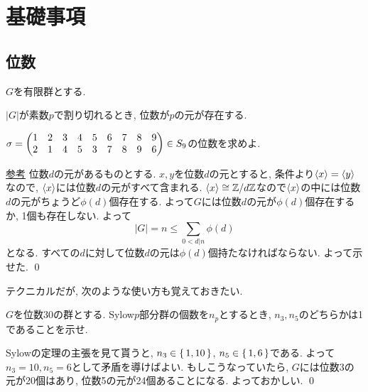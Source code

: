 \section{基礎事項}
\subsection{位数}

\begin{prop} $G$を有限群とする.
\ben
\item $|G|$が素数$p$で割り切れるとき, 位数が$p$の元が存在する.
\een
\end{prop}

\begin{prac}
$\sigma = \begin{pmatrix} 1&2&3&4&5&6&7&8&9\\ 2&1&4&5&3&7&8&9&6 \end{pmatrix}\in S_9$の位数を求めよ.
\end{prac}

    \begin{egans} \href{https://math.stackexchange.com/questions/1302635/a-finite-group-which-has-a-unique-subgroup-of-order-d-for-each-d-mid-n}{参考}
位数$d$の元があるものとする. $x,y$を位数$d$の元とすると, 条件より$\langle x\rangle = \langle y\rangle$なので, $\langle x\rangle$には位数$d$の元がすべて含まれる. $\langle x \rangle \cong \mathbb{Z}/d\mathbb{Z}$なので$\langle x\rangle$の中には位数$d$の元がちょうど$\phi(d)$個存在する. よって$G$には位数$d$の元が$\phi(d)$個存在するか, 1個も存在しない. よって
\[|G|=n \leq \sum_{0<d|n} \phi(d) \]
となる. すべての$d$に対して位数$d$の元は$\phi(d)$個持たなければならない. よって示せた. \qed
\end{egans}
テクニカルだが, 次のような使い方も覚えておきたい.
\begin{egprob}
$G$を位数$30$の群とする. Sylow$p$部分群の個数を$n_p$とするとき, $n_3, n_5$のどちらかは1であることを示せ.
\end{egprob}
\begin{egans}
Sylowの定理の主張を見て貰うと, $n_3 \in \set{1,10}$, $n_5\in \set{1,6}$である. よって$n_3=10, n_5=6$として矛盾を導けばよい. もしこうなっていたら, $G$には位数3の元が20個はあり, 位数5の元が24個あることになる. よっておかしい. \qed
\end{egans}


